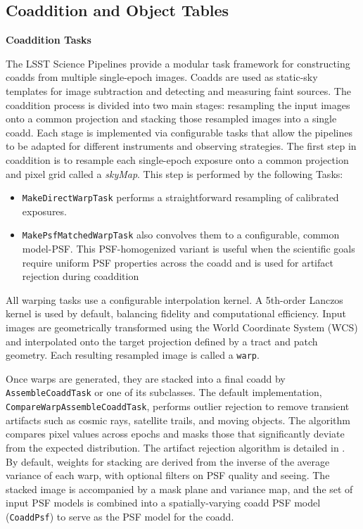 \subsection{Coaddition and Object Tables}

\textbf{Coaddition Tasks}
\label{sec:coaddition-tasks}

The LSST Science Pipelines provide a modular task framework for constructing coadds from multiple single-epoch images.
Coadds are used as static-sky templates for image subtraction and detecting and measuring faint sources.
The coaddition process is divided into two main stages: resampling the input images onto a common projection and stacking those resampled images into a single coadd.
Each stage is implemented via configurable tasks that allow the pipelines to be adapted for different instruments and observing strategies.
The first step in coaddition is to resample each single-epoch exposure onto a common projection and pixel grid called a \textit{skyMap}.
This step is performed by the following Tasks:
\begin{itemize}
\item \texttt{MakeDirectWarpTask} performs a straightforward resampling of calibrated exposures.
 \item \texttt{MakePsfMatchedWarpTask} also convolves them to a configurable, common model-PSF.
 This PSF-homogenized variant is useful when the scientific goals require uniform PSF properties across the coadd and is used for artifact rejection during coaddition
 \end{itemize}

All warping tasks use a configurable interpolation kernel. A 5th-order Lanczos kernel is used by default, balancing fidelity and computational efficiency.
Input images are geometrically transformed using the World Coordinate System (WCS) and interpolated onto the target projection defined by a tract and patch geometry.
Each resulting resampled image is called a \texttt{warp}.

Once warps are generated, they are stacked into a final coadd by \texttt{AssembleCoaddTask} or one of its subclasses.
The default implementation, \texttt{CompareWarpAssembleCoaddTask}, performs outlier rejection to remove transient artifacts such as cosmic rays, satellite trails, and moving objects.
The algorithm compares pixel values across epochs and masks those that significantly deviate from the expected distribution.
The artifact rejection algorithm is detailed in \citet{DMTN-080}.
By default, weights for stacking are derived from the inverse of the average variance of each warp, with optional filters on PSF quality and seeing.
The stacked image is accompanied by a mask plane and variance map, and the set of input PSF models is combined into a spatially-varying coadd PSF model (\texttt{CoaddPsf}) to serve as the PSF model for the coadd.

